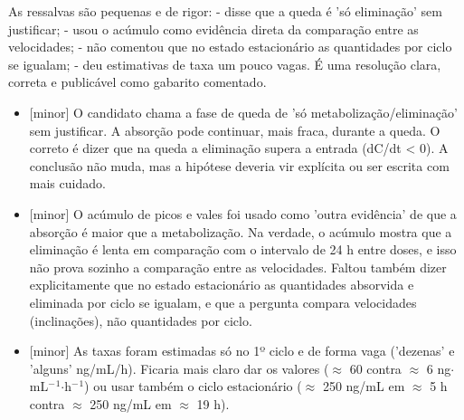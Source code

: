 \documentclass{article}%
\begin{document}
\newline%
As ressalvas são pequenas e de rigor:\newline%
{-} disse que a queda é 'só eliminação' sem justificar;\newline%
{-} usou o acúmulo como evidência direta da comparação entre as velocidades;\newline%
{-} não comentou que no estado estacionário as quantidades por ciclo se igualam;\newline%
{-} deu estimativas de taxa um pouco vagas.\newline%
\newline%
É uma resolução clara, correta e publicável como gabarito comentado.%
\begin{itemize}%
\item%
{[}minor{]} O candidato chama a fase de queda de 'só metabolização/eliminação' sem justificar. A absorção pode continuar, mais fraca, durante a queda. O correto é dizer que na queda a eliminação supera a entrada (dC/dt < 0). A conclusão não muda, mas a hipótese deveria vir explícita ou ser escrita com mais cuidado.%
\item%
{[}minor{]} O acúmulo de picos e vales foi usado como 'outra evidência' de que a absorção é maior que a metabolização. Na verdade, o acúmulo mostra que a eliminação é lenta em comparação com o intervalo de 24 h entre doses, e isso não prova sozinho a comparação entre as velocidades. Faltou também dizer explicitamente que no estado estacionário as quantidades absorvida e eliminada por ciclo se igualam, e que a pergunta compara velocidades (inclinações), não quantidades por ciclo.%
\item%
{[}minor{]} As taxas foram estimadas só no 1º ciclo e de forma vaga ('dezenas' e 'alguns' ng/mL/h). Ficaria mais claro dar os valores ($\approx$ 60 contra $\approx$ 6 ng$\cdot$mL$^{-}$$^{1}$$\cdot$h$^{-}$$^{1}$) ou usar também o ciclo estacionário ($\approx$ 250 ng/mL em $\approx$ 5 h contra $\approx$ 250 ng/mL em $\approx$ 19 h).%
\end{itemize}%
\end{document}
